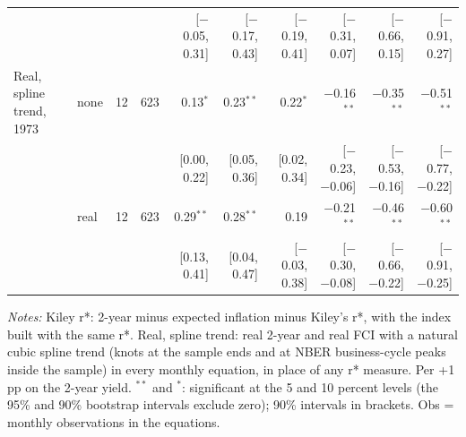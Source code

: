 \begin{table}[tp]
{\begin{tabular}{llcrrrrrrr}
 & & & & {\scriptsize [$-$0.05, 0.31]} & {\scriptsize [$-$0.17, 0.43]} & {\scriptsize [$-$0.19, 0.41]} & {\scriptsize [$-$0.31, 0.07]} & {\scriptsize [$-$0.66, 0.15]} & {\scriptsize [$-$0.91, 0.27]}\\
\addlinespace
Real, spline trend, 1973 & none & 12 & 623 & 0.13$^{*}$ & 0.23$^{**}$ & 0.22$^{*}$ & $-$0.16$^{**}$ & $-$0.35$^{**}$ & $-$0.51$^{**}$\\
 & & & & {\scriptsize [0.00, 0.22]} & {\scriptsize [0.05, 0.36]} & {\scriptsize [0.02, 0.34]} & {\scriptsize [$-$0.23, $-$0.06]} & {\scriptsize [$-$0.53, $-$0.16]} & {\scriptsize [$-$0.77, $-$0.22]}\\
 & real & 12 & 623 & 0.29$^{**}$ & 0.28$^{**}$ & 0.19 & $-$0.21$^{**}$ & $-$0.46$^{**}$ & $-$0.60$^{**}$\\
 & & & & {\scriptsize [0.13, 0.41]} & {\scriptsize [0.04, 0.47]} & {\scriptsize [$-$0.03, 0.38]} & {\scriptsize [$-$0.30, $-$0.08]} & {\scriptsize [$-$0.66, $-$0.22]} & {\scriptsize [$-$0.91, $-$0.25]}\\
\bottomrule\end{tabular}}
\begin{flushleft}\footnotesize\textit{Notes:} Kiley r*: 2-year minus expected inflation minus Kiley's r*, with the index built with the same r*. Real, spline trend: real 2-year and real FCI with a natural cubic spline trend (knots at the sample ends and at NBER business-cycle peaks inside the sample) in every monthly equation, in place of any r* measure. Per +1 pp on the 2-year yield. $^{**}$ and $^{*}$: significant at the 5 and 10 percent levels (the 95\% and 90\% bootstrap intervals exclude zero); 90\% intervals in brackets. Obs = monthly observations in the equations.\end{flushleft}
\end{table}
